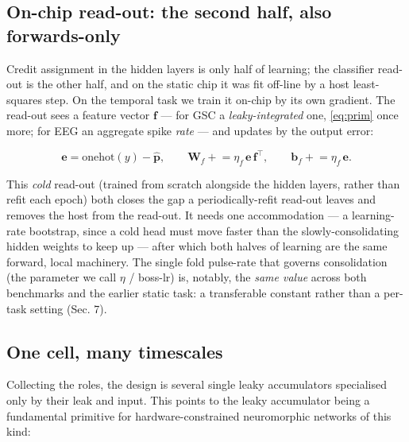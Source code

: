 \documentclass[11pt]{article}
\begin{document}
\hypertarget{sec:readout}{%
\subsection{On-chip read-out: the second half, also
forwards-only}\label{sec:readout}}

Credit assignment in the hidden layers is only half of learning; the
classifier read-out is the other half, and on the static chip it was fit
off-line by a host least-squares step. On the temporal task we train it
on-chip by its own gradient. The read-out sees a feature vector
\(\bm f\) --- for GSC a \emph{leaky-integrated} one, \eqref{eq:prim}
once more; for EEG an aggregate spike \emph{rate} --- and updates by the
output error:

\begin{equation}
\bm e = \mathrm{onehot}(y) - \hat{\bm p}, \qquad
\bm W_f \mathrel{+}= \eta_f\, \bm e\, \bm f^{\!\top}, \qquad
\bm b_f \mathrel{+}= \eta_f\, \bm e .
\label{eq:readout}
\end{equation}

This \emph{cold} read-out (trained from scratch alongside the hidden
layers, rather than refit each epoch) both closes the gap a
periodically-refit read-out leaves and removes the host from the
read-out. It needs one accommodation --- a learning-rate bootstrap,
since a cold head must move faster than the slowly-consolidating hidden
weights to keep up --- after which both halves of learning are the same
forward, local machinery. The single fold pulse-rate that governs
consolidation (the parameter we call \(\eta\) / boss-lr) is, notably,
the \emph{same value} across both benchmarks and the earlier static
task: a transferable constant rather than a per-task setting (Sec. 7).

\hypertarget{sec:timescales}{%
\subsection{One cell, many timescales}\label{sec:timescales}}

Collecting the roles, the design is several single leaky accumulators
specialised only by their leak and input. This points to the leaky
accumulator being a fundamental primitive for hardware-constrained
neuromorphic networks of this kind:
\end{document}
